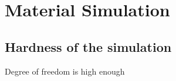 \chapter{Material Simulation}


\section{Hardness of the simulation}

Degree of freedom is high enough